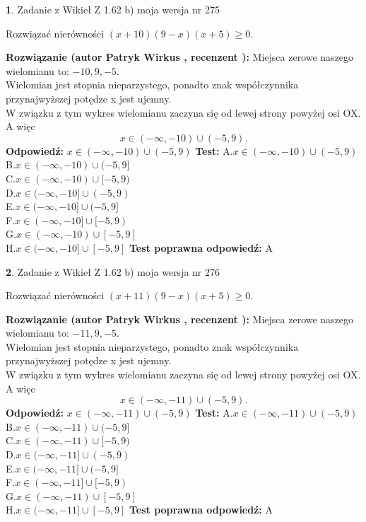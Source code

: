 \documentclass[12pt, a4paper]{article}
\theoremstyle{definition} %
\newtheorem{zad}{}
\newcommand{\zadStart}[1]{\begin{zad}#1\newline}
\newcommand{\zadStop}{\end{zad}}
\newcommand{\rozwStart}[2]{\noindent \textbf{Rozwiązanie (autor #1 , recenzent #2): }\newline}
\newcommand{\rozwStop}{\newline}
\newcommand{\odpStart}{\noindent \textbf{Odpowiedź:}\newline}
\newcommand{\odpStop}{\newline}
\newcommand{\testStart}{\noindent \textbf{Test:}\newline}
\newcommand{\testStop}{\newline}
\newcommand{\kluczStart}{\noindent \textbf{Test poprawna odpowiedź:}\newline}
\newcommand{\kluczStop}{\newline}
\begin{document}
\zadStart{Zadanie z Wikieł Z 1.62 b) moja wersja nr 275}

Rozwiązać nierówności $(x+10)(9-x)(x+5)\ge0$.
\zadStop
\rozwStart{Patryk Wirkus}{}
Miejsca zerowe naszego wielomianu to: $-10, 9, -5$.\\
Wielomian jest stopnia nieparzystego, ponadto znak współczynnika przy\linebreak najwyższej potędze x jest ujemny.\\ W związku z tym wykres wielomianu zaczyna się od lewej strony powyżej osi OX. A więc $$x \in (-\infty,-10) \cup (-5,9).$$
\rozwStop
\odpStart
$x \in (-\infty,-10) \cup (-5,9)$
\odpStop
\testStart
A.$x \in (-\infty,-10) \cup (-5,9)$\\
B.$x \in (-\infty,-10) \cup (-5,9]$\\
C.$x \in (-\infty,-10) \cup [-5,9)$\\
D.$x \in (-\infty,-10] \cup (-5,9)$\\
E.$x \in (-\infty,-10] \cup (-5,9]$\\
F.$x \in (-\infty,-10] \cup [-5,9)$\\
G.$x \in (-\infty,-10) \cup [-5,9]$\\
H.$x \in (-\infty,-10] \cup [-5,9]$
\testStop
\kluczStart
A
\kluczStop



\zadStart{Zadanie z Wikieł Z 1.62 b) moja wersja nr 276}

Rozwiązać nierówności $(x+11)(9-x)(x+5)\ge0$.
\zadStop
\rozwStart{Patryk Wirkus}{}
Miejsca zerowe naszego wielomianu to: $-11, 9, -5$.\\
Wielomian jest stopnia nieparzystego, ponadto znak współczynnika przy\linebreak najwyższej potędze x jest ujemny.\\ W związku z tym wykres wielomianu zaczyna się od lewej strony powyżej osi OX. A więc $$x \in (-\infty,-11) \cup (-5,9).$$
\rozwStop
\odpStart
$x \in (-\infty,-11) \cup (-5,9)$
\odpStop
\testStart
A.$x \in (-\infty,-11) \cup (-5,9)$\\
B.$x \in (-\infty,-11) \cup (-5,9]$\\
C.$x \in (-\infty,-11) \cup [-5,9)$\\
D.$x \in (-\infty,-11] \cup (-5,9)$\\
E.$x \in (-\infty,-11] \cup (-5,9]$\\
F.$x \in (-\infty,-11] \cup [-5,9)$\\
G.$x \in (-\infty,-11) \cup [-5,9]$\\
H.$x \in (-\infty,-11] \cup [-5,9]$
\testStop
\kluczStart
A
\kluczStop
\end{document}
